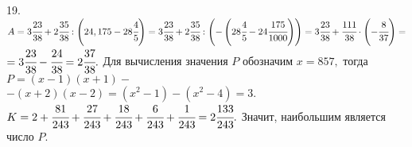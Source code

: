 19. $A=3\cfrac{23}{38}+2\cfrac{35}{38}:\left(24,175-28\cfrac{4}{5}\right)=3\cfrac{23}{38}+2\cfrac{35}{38}:\left(-\left(28\cfrac{4}{5}-24\cfrac{175}{1000}\right)\right)=
3\cfrac{23}{38}+\cfrac{111}{38}\cdot\left(-\cfrac{8}{37}\right)=$\\$=3\cfrac{23}{38}-\cfrac{24}{38}=2\cfrac{37}{38}.$ Для вычисления значения $P$ обозначим $x=857,$ тогда $P=(x-1)(x+1)-$\\$-(x+2)(x-2)=(x^2-1)-(x^2-4)=3.$ $K=2+\cfrac{81}{243}+\cfrac{27}{243}+\cfrac{18}{243}+\cfrac{6}{243}+\cfrac{1}{243}=2\cfrac{133}{243}.$ Значит, наибольшим является число $P.$\\

